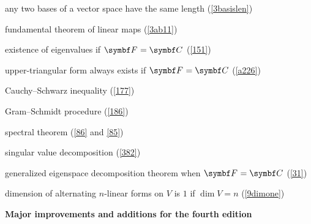 \begin{Itemize}
\item
any two bases of a vector space have the same length (\ref{3basislen})

\item
fundamental theorem of linear maps (\ref{3ab11})

\item
existence of eigenvalues if $\F{} = \C{}$ (\ref{151})

\item
upper-triangular form always exists if $\F{} = \C{}$ (\ref{a226})

\item
Cauchy--Schwarz inequality (\ref{177})


\item
Gram--Schmidt procedure (\ref{186})

\item
spectral theorem (\ref{86} and \ref{85})

\item
singular value decomposition (\ref{382})

\item
generalized eigenspace decomposition theorem when $\F{} = \C{}$ (\ref{31})

\item
dimension of alternating $n$-linear forms on $V$ is $1$ if $\dim V = n$ (\ref{9dimone})

\end{Itemize}

\pagebreak[3]

\textbf{Major improvements and additions for the fourth edition}

